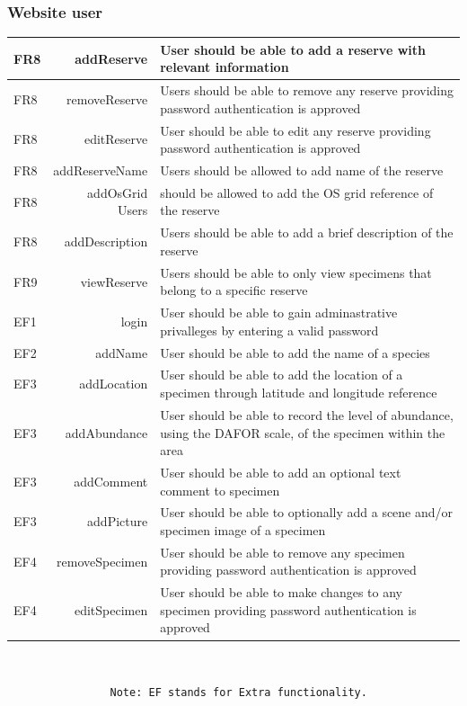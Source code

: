 	\subsubsection{Website user}
	\begin{tabular}{| l  r | p{10cm} |}
		\hline
		FR8 & addReserve & User should be able to add a reserve with relevant information \\ \hline
		FR8 & removeReserve & Users should be able to remove any reserve providing password authentication is approved \\ \hline
		FR8 & editReserve & User should be able to edit any reserve providing password authentication is approved \\ \hline
		FR8 & addReserveName & Users should be allowed to add name of the reserve \\ \hline
		FR8 & addOsGrid Users & should be allowed to add the OS grid reference of the reserve \\ \hline
		FR8 & addDescription & Users should be able to add a brief description of the reserve \\ \hline
		FR9 & viewReserve & Users should be able to only view specimens that belong to a specific reserve \\ \hline
		EF1 & login  & User should be able to gain adminastrative privalleges by entering a valid password\\ \hline
		EF2 & addName & User should be able to add the name of a species \\ \hline
		EF3 & addLocation  & User should be able to add the location of a specimen through latitude and longitude reference \\ \hline
		EF3 & addAbundance & User should be able to record the level of abundance, using the DAFOR scale, of the specimen within the area \\ \hline
		EF3 & addComment & User should be able to add an optional text comment to specimen\\ \hline
		EF3 & addPicture & User should be able to optionally add a scene and/or specimen image of a specimen \\ \hline
		EF4 & removeSpecimen & User should be able to remove any specimen providing password authentication is approved \\ \hline
		EF4 & editSpecimen & User should be able to make changes to any specimen providing password authentication is approved \\ \hline
	\end{tabular} \\
\begin{verbatim}
        		Note: EF stands for Extra functionality.
	\end{verbatim}
